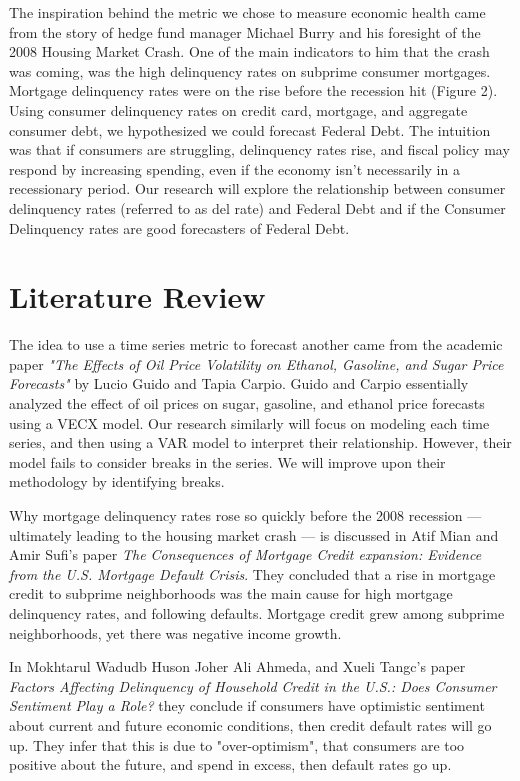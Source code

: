 \documentclass[11pt, oneside]{article}   	%
\begin{document}
The inspiration behind the metric we chose to measure economic health came from the story of hedge fund manager Michael Burry and his foresight of the 2008 Housing Market Crash. One of the main indicators to him that the crash was coming, was the high delinquency rates on subprime consumer mortgages. Mortgage delinquency rates were on the rise before the recession hit (Figure 2). Using consumer delinquency rates on credit card, mortgage, and aggregate consumer debt, we hypothesized we could forecast Federal Debt. The intuition was that if consumers are struggling, delinquency rates rise, and fiscal policy may respond by increasing spending, even if the economy isn't necessarily in a recessionary period. Our research will explore the relationship between consumer delinquency rates (referred to as del rate) and Federal Debt and if the Consumer Delinquency rates are good forecasters of Federal Debt.



\section{Literature Review}
	The idea to use a time series metric to forecast another came from the academic paper \emph{"The Effects of Oil Price Volatility on Ethanol, Gasoline, and Sugar Price Forecasts"} by Lucio Guido and Tapia Carpio. Guido and Carpio essentially analyzed the effect of oil prices on sugar, gasoline, and ethanol price forecasts using a VECX model. Our research similarly will focus on modeling each time series, and then using a VAR model to interpret their relationship. However, their model fails to consider breaks in the series. We will improve upon their methodology by identifying breaks. 
	
	Why mortgage delinquency rates rose so quickly before the 2008 recession --- ultimately leading to the housing market crash --- is discussed in Atif Mian and Amir Sufi's paper \emph{The Consequences of Mortgage Credit expansion: Evidence from the U.S. Mortgage Default Crisis}. They concluded that a rise in mortgage credit to subprime neighborhoods was the main cause for high mortgage delinquency rates, and following defaults. Mortgage credit grew among subprime neighborhoods, yet there was negative income growth.
	
	In Mokhtarul Wadudb Huson Joher Ali Ahmeda, and Xueli Tangc's paper \emph{Factors Affecting Delinquency of Household Credit in the U.S.: Does Consumer Sentiment Play a Role?}  they conclude if consumers have optimistic sentiment about current and future economic conditions, then credit default rates will go up. They infer that this is due to "over-optimism", that consumers are too positive about the future, and spend in excess, then default rates go up. 
	
\end{document}
